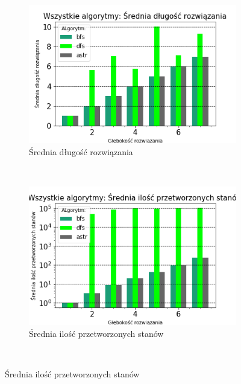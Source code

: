 \documentclass{classrep}
\begin{document}
\begin{figure}[H]
    \centering
    \begin{subfigure}[t]{0.45\textwidth}
        \includegraphics[width=\textwidth]{charts/ALL_path_length.png}
        \caption{Średnia długość rozwiązania}
        \label{ALL:path_length}
    \end{subfigure}
    ~ %
    \begin{subfigure}[t]{0.45\textwidth}
        \includegraphics[width=\textwidth]{charts/ALL_processed.png}
        \caption{Średnia ilość przetworzonych stanów}
        \label{ALL:processed}
    \end{subfigure}
    \qquad
    ~ %

\end{figure}
\end{document}
